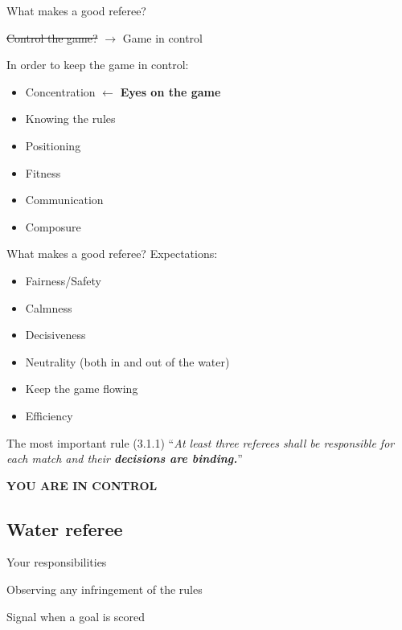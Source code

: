 \documentclass{beamer}
\begin{document}
    \begin{frame}{What makes a good referee?}
        \begin{center}
            \sout{Control the game?} $\rightarrow$ Game in control
        \end{center}
        \pause
        In order to keep the game in control:
        \begin{itemize}
            \item Concentration \pause $\leftarrow$ \textbf{Eyes on the game} \pause
            \item Knowing the rules \pause
            \item Positioning \pause
            \item Fitness \pause
            \item Communication \pause
            \item Composure
        \end{itemize}
    \end{frame}

    \begin{frame}{What makes a good referee?}
        Expectations: \pause
        \begin{itemize}
            \item Fairness/Safety \pause
            \item Calmness \pause
            \item Decisiveness \pause
            \item Neutrality (both in and out of the water) \pause
            \item Keep the game flowing \pause
            \item Efficiency
        \end{itemize}
    \end{frame}

    \begin{frame}{The most important rule}
        \pause
        (3.1.1) ``\textit{At least three referees shall be responsible for each match and their \textbf{decisions are
binding.}}''

        \pause

        \begin{center}
            \textbf{\uppercase{You are in control}}
        \end{center}
    \end{frame}

    \subsection{Water referee}
    \begin{frame}{Your responsibilities}
        \begin{center}
            Observing any infringement of the rules

            Signal when a goal is scored
        \end{center}
    \end{frame}
\end{document}
